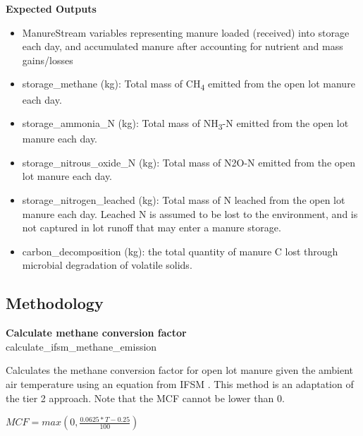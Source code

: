 \begin{refsection}
\vspace{0.5cm}

\textbf{Expected Outputs}

\begin{itemize}
    \item ManureStream variables representing manure loaded (received) into storage each day, and accumulated manure after accounting for nutrient and mass gains/losses
    \item storage\_methane (kg): Total mass of CH\textsubscript{4} emitted from the open lot manure each day.
    \item storage\_ammonia\_N (kg): Total mass of NH\textsubscript{3}-N emitted from the open lot manure each day.
    \item storage\_nitrous\_oxide\_N (kg): Total mass of N2O-N emitted from the open lot manure each day.
    \item storage\_nitrogen\_leached (kg): Total mass of N leached from the open lot manure each day. Leached N is assumed to be lost to the environment, and is not captured in lot runoff that may enter a manure storage.
    \item carbon\_decomposition (kg): the total quantity of manure C lost through microbial degradation of volatile solids. 

\end{itemize}
\vspace{0.2cm}
    
    
\subsection{Methodology}


    
    \textbf{Calculate methane conversion factor}\\
    calculate\_ifsm\_methane\_emission

    Calculates the methane conversion factor for open lot manure given the ambient air temperature using an equation from IFSM \parencite{Rotz2023}. This method is an adaptation of the \cite{IPCC2006} tier 2 approach. Note that the MCF cannot be lower than 0.
     \vspace{0.5cm}        
    
    \begin{center}
        \(MCF = max(0, \frac{0.0625 * T - 0.25}{100})\)
    \end{center}
        \vspace{0.5cm} 
    

\end{refsection}
